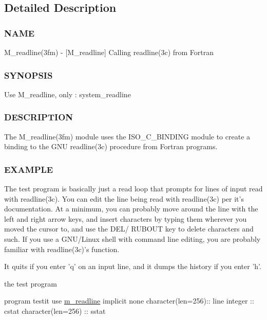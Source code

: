 \subsection{Detailed Description}
\subsubsection*{N\+A\+ME}

M\+\_\+readline(3fm) -\/ \mbox{[}M\+\_\+readline\mbox{]} Calling readline(3c) from Fortran \subsubsection*{S\+Y\+N\+O\+P\+S\+IS}

Use M\+\_\+readline, only \+: system\+\_\+readline \subsubsection*{D\+E\+S\+C\+R\+I\+P\+T\+I\+ON}

\begin{DoxyVerb}The M_readline(3fm) module uses the ISO_C_BINDING module to create a
binding to the GNU readline(3c) procedure from Fortran programs.
\end{DoxyVerb}


\subsubsection*{E\+X\+A\+M\+P\+LE}

\begin{DoxyVerb}The test program is basically just a read loop that prompts for
lines of input read with readline(3c). You can edit the line being
read with readline(3c) per it's documentation. At a minimum, you can
probably move around the line with the left and right arrow keys, and
insert characters by typing them wherever you moved the cursor to,
and use the DEL/ RUBOUT key to delete characters and such. If you use
a GNU/Linux shell with command line editing, you are probably familiar
with readline(3c)'s function.

It quits if you enter 'q' on an input line, and it dumps the history if
you enter 'h'.
\end{DoxyVerb}


the test program

program testit use \hyperlink{namespacem__readline}{m\+\_\+readline} implicit none character(len=256)\+:\+: line integer \+:\+: cstat character(len=256) \+:\+: sstat

